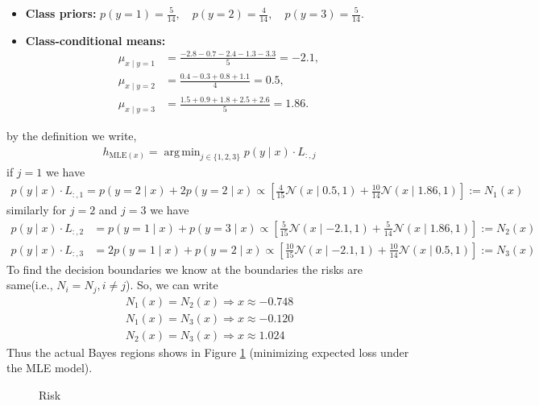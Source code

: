 \documentclass[solution,addpoints,12pt]{exam}
\DeclareMathOperator*{\argmin}{arg\,min}
\begin{document}
\begin{questions}
\begin{parts}
\begin{subparts}
\begin{solution}
	\begin{itemize}
		\item \textbf{Class priors:}
		$p(y=1) = \frac{5}{14}, \quad p(y=2) = \frac{4}{14}, \quad p(y=3) = \frac{5}{14}.$
		\item \textbf{Class-conditional means:}
		\begin{align*}
			\mu_{x \mid y=1} &= \frac{-2.8 - 0.7 - 2.4 - 1.3 - 3.3}{5} = -2.1,\\
			\mu_{x \mid y=2} &= \frac{0.4 - 0.3 + 0.8 + 1.1}{4} = 0.5,\\
			\mu_{x \mid y=3} &= \frac{1.5 + 0.9 + 1.8 + 2.5 + 2.6}{5} = 1.86.
		\end{align*}
	\end{itemize}
	by the definition we write,
	\begin{align*}
		h_{\text{MLE}(x)}=\argmin_{j\in\{1,2,3\}} p(y\mid x)\cdot L_{:,j}
	\end{align*}
	if $j=1$ we have
	\begin{align*}
		p(y\mid x)\cdot L_{:,1} =p(y=2\mid x)+2p(y=2\mid x)\propto\left[\frac{4}{15}\mathcal{N}(x\mid 0.5,1)+\frac{10}{14}\mathcal{N}(x\mid 1.86,1)\right]:=N_1(x)
	\end{align*}
	similarly for $j=2 $ and $j=3$ we have
	\begin{align*}
		p(y\mid x)\cdot L_{:,2}& =p(y=1\mid x)+p(y=3\mid x)\propto\left[\frac{5}{15}\mathcal{N}(x\mid -2.1,1)+\frac{5}{14}\mathcal{N}(x\mid 1.86,1)\right]:=N_2(x)\\
		p(y\mid x)\cdot L_{:,3}& =2p(y=1\mid x)+p(y=2\mid x)\propto\left[\frac{10}{15}\mathcal{N}(x\mid -2.1,1)+\frac{10}{14}\mathcal{N}(x\mid 0.5,1)\right]:=N_3(x)
	\end{align*}
	To find the decision boundaries we know at the boundaries the risks are same(i.e., $N_i=N_j,i\neq j $). So, we can write
	\begin{align*}
		N_1(x)=N_2(x)\Rightarrow x\approx -0.748\\
		N_1(x)=N_3(x)\Rightarrow x\approx -0.120\\
		N_2(x)=N_3(x)\Rightarrow x\approx 1.024
	\end{align*}
	Thus the actual Bayes regions shows in Figure \ref{fig:Risk} (minimizing expected loss under the MLE model).
	\begin{figure}[H]
		\centering
		\caption{Risk}
		\label{fig:Risk}
	\end{figure}
\end{solution}


\end{subparts}
\end{parts}
\end{questions}
\end{document}

